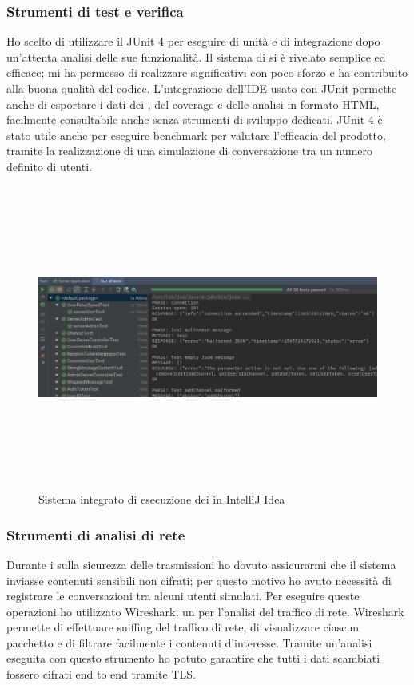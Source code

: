 		\subsubsection{Strumenti di test e verifica}
		Ho scelto di utilizzare il  JUnit 4 per eseguire  di unità e di integrazione dopo un'attenta analisi delle sue funzionalità. Il sistema di  si è rivelato semplice ed efficace; mi ha permesso di realizzare  significativi con poco sforzo e ha contribuito alla buona qualità del codice. L'integrazione dell'IDE usato con JUnit permette anche di esportare i dati dei , del coverage e delle analisi in formato \gls{HTML}, facilmente consultabile anche senza strumenti di sviluppo dedicati. JUnit 4 è stato utile anche per eseguire benchmark per valutare l'efficacia del prodotto, tramite la realizzazione di una simulazione di conversazione tra un numero definito di utenti.
		\begin{figure}[H]
			\begin{center}
				\includegraphics[width=16.5cm,height=10cm,keepaspectratio]{immagini/intellij-tests}
				\caption{Sistema integrato di esecuzione dei  in IntelliJ Idea}
			\end{center}
		\end{figure}
		
		\subsubsection{Strumenti di analisi di rete}
		Durante i  sulla sicurezza delle trasmissioni ho dovuto assicurarmi che il sistema inviasse contenuti sensibili non cifrati; per questo motivo ho avuto necessità di registrare le conversazioni tra alcuni utenti simulati. Per eseguire queste operazioni ho utilizzato Wireshark, un   per l'analisi del traffico di rete. Wireshark permette di effettuare sniffing del traffico di rete, di visualizzare ciascun pacchetto e di filtrare facilmente i contenuti d'interesse. Tramite un'analisi eseguita con questo strumento ho potuto garantire che tutti i dati scambiati fossero cifrati end to end tramite \gls{TLS}.\@
		
